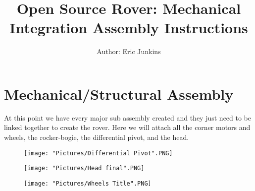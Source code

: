 \documentclass[12pt]{article}
\begin{document}
\title{Open Source Rover: Mechanical Integration Assembly Instructions}
\author{Author: Eric Junkins}

\makeatletter         
\def\@maketitle{
\begin{center}	
	\makebox[\textwidth][c]{ \texttt{[image: "Pictures/Final Title".png]}}
	{\Huge \bfseries \sffamily \@title }\\[3ex] 
	{\Large \sffamily \@author}\\[3ex] 
	\texttt{[image: "Pictures/JPL logo".png]}
\end{center}}
\makeatother

\maketitle






\newpage

\tableofcontents

\newpage



\section{Mechanical/Structural Assembly}
At this point we have every major sub assembly created and they just need to be linked together to create the rover. Here we will attach all the corner motors and wheels, the rocker-bogie, the differential pivot, and the head. 


\begin{figure}[H]
  	\centering
  	\begin{minipage}[b]{0.30\textwidth}
    		\texttt{[image: "Pictures/Differential Pivot".PNG]}
  	\end{minipage}
  	\hfill
  	\begin{minipage}[b]{0.30\textwidth}
    		\texttt{[image: "Pictures/Head final".PNG]}
  	\end{minipage}
    	\hfill
  	\begin{minipage}[b]{0.30\textwidth}
    		\texttt{[image: "Pictures/Wheels Title".PNG]}
  	\end{minipage}
\end{figure}
\end{document}

